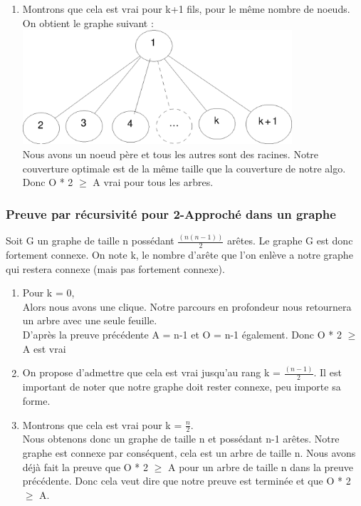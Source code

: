 \begin{enumerate}
\item Montrons que cela est vrai pour k+1 fils, pour le m\^eme nombre de noeuds.\\

On obtient le graphe suivant :\\

\bigskip
\includegraphics[width=10cm]{demo2}\\

\bigskip
Nous avons un noeud p\`ere et tous les autres sont des racines. Notre couverture optimale est de la m\^eme taille que la couverture de notre algo. Donc O  * 2 $\geq$ A vrai pour tous les arbres.

\end{enumerate}

\subsubsection{Preuve par r\'ecursivit\'e pour 2-Approch\'e dans un graphe}

Soit G un graphe de taille n poss\'edant $\frac{(n(n-1))}{2}$ ar\^etes. Le graphe G est donc fortement connexe.
On note k, le nombre d'ar\^ete que l'on enl\`eve a notre graphe qui restera connexe (mais pas fortement connexe).

\bigskip
\begin{enumerate}
 \item Pour k = 0,\\
Alors nous avons une clique. Notre parcours en profondeur nous retournera un arbre avec une seule feuille. \\
D'apr\`es la preuve pr\'ec\'edente A = n-1 et O = n-1 \'egalement. Donc O * 2 $\geq$ A est vrai

\item On propose d'admettre que cela est vrai jusqu'au rang k = $\frac{(n-1)}{2}$. Il est important de noter que notre graphe doit rester connexe, peu importe sa forme.

\item Montrons que cela est vrai pour k = $\frac{n}{2}$.\\
Nous obtenons donc un graphe de taille n et poss\'edant n-1 ar\^etes. Notre graphe est connexe par cons\'equent, cela est un arbre de taille n. Nous avons d\'ej\`a fait la preuve que O * 2 $\geq$ A pour un arbre de taille n dans la preuve pr\'ec\'edente. Donc cela veut dire que notre preuve est termin\'ee et que O * 2 $\geq$ A.

\end{enumerate}
